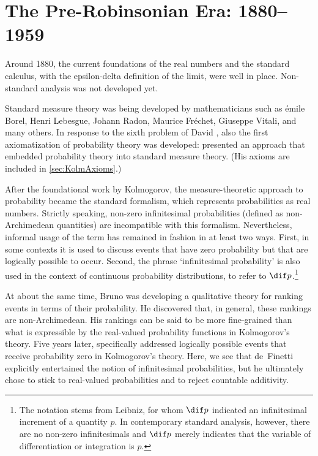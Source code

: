 \section{The Pre-Robinsonian Era: 1880--1959}\label{sec:preR}
Around 1880, the current foundations of the real numbers and the standard calculus, with the epsilon-delta definition of the limit, were well in place. Non-standard analysis was not developed yet.

Standard measure theory was being developed by mathematicians such as {\'{e}}mile Borel, Henri Lebesgue, Johann Radon, Maurice Fr\'{e}chet, Giuseppe Vitali, and many others. In response to the sixth problem of David \citet{Hilbert:1900}, also the first axiomatization of probability theory was developed: \citet{Kolmogorov:1933} presented an approach that embedded probability theory into standard measure theory. (His axioms are included in \autoref{sec:KolmAxioms}.)

After the foundational work by Kolmogorov, the measure-theoretic approach to probability became the standard formalism, which represents probabilities as real numbers. Strictly speaking, non-zero infinitesimal probabilities (defined as non-Archimedean quantities) are incompatible with this formalism. Nevertheless, informal usage of the term has remained in fashion in at least two ways. First, in some contexts it is used to discuss events that have zero probability but that are logically possible to occur. Second, the phrase `infinitesimal probability' is also used in the context of continuous probability distributions, to refer to $\dif p$.\footnote{The notation stems from Leibniz, for whom $\dif p$ indicated an infinitesimal increment of a quantity $p$. In contemporary standard analysis, however, there are no non-zero infinitesimals and $\dif p$ merely indicates that the variable of differentiation or integration is $p$.}

At about the same time, Bruno \citet{deFinetti:1931} was developing a qualitative theory for ranking events in terms of their probability. He discovered that, in general, these rankings are non-Archimedean. His rankings can be said to be more fine-grained than what is expressible by the real-valued probability functions in Kolmogorov's theory. Five years later, \citet{deFinetti:1936} specifically addressed logically possible events that receive probability zero in Kolmogorov's theory. Here, we see that de~Finetti explicitly entertained the notion of infinitesimal probabilities, but he ultimately chose to stick to real-valued probabilities and to reject countable additivity.

